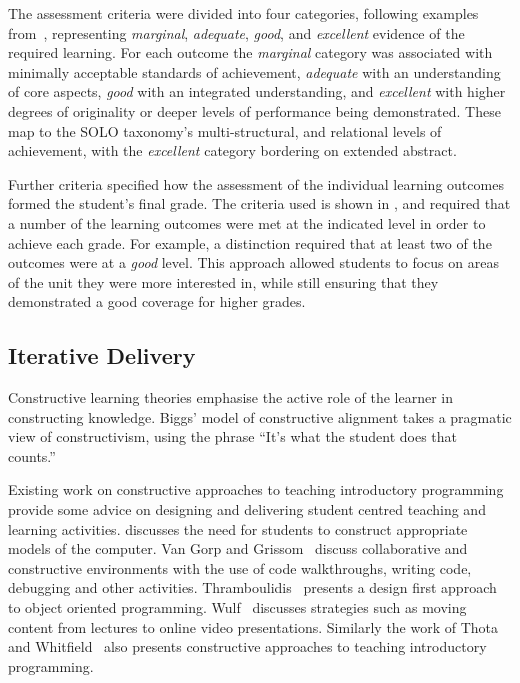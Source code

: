 The assessment criteria were divided into four categories, following examples from~\cite{Biggs:2007}, representing \emph{marginal}, \emph{adequate}, \emph{good}, and \emph{excellent} evidence of the required learning. For each outcome the \emph{marginal} category was associated with minimally acceptable standards of achievement, \emph{adequate} with an understanding of core aspects, \emph{good} with an integrated understanding, and \emph{excellent} with higher degrees of originality or deeper levels of performance being demonstrated. These map to the SOLO taxonomy's multi-structural, and relational levels of achievement, with the \emph{excellent} category bordering on extended abstract.

Further criteria specified how the assessment of the individual learning outcomes formed the student's final grade. The criteria used is shown in , and required that a number of the learning outcomes were met at the indicated level in order to achieve each grade. For example, a distinction required that at least two of the outcomes were at a \emph{good} level. This approach allowed students to focus on areas of the unit they were more interested in, while still ensuring that they demonstrated a good coverage for higher grades.


\subsection{Iterative Delivery} %
\label{sub:iterative_delivery}

Constructive learning theories emphasise the active role of the learner in constructing knowledge. Biggs' model of constructive alignment takes a pragmatic view of constructivism, using the phrase ``It's what the student does that counts.''~\cite{Biggs:1996c} %

Existing work on constructive approaches to teaching introductory programming provide some advice on designing and delivering student centred teaching and learning activities. \citet{BenAri:1998,BenAri2001} discusses the need for students to construct appropriate models of the computer. Van Gorp and Grissom~\cite{VanGorp:2001} discuss collaborative and constructive environments with the use of code walkthroughs, writing code, debugging and other activities. Thramboulidis~\cite{Thramboulidis:2003a} presents a design first approach to object oriented programming. Wulf~\cite{Wulf:2005} discusses strategies such as moving content from lectures to online video presentations. Similarly the work of Thota and Whitfield~\cite{Thota:2010} also presents constructive approaches to teaching introductory programming.

